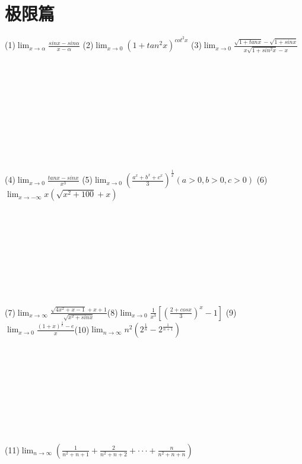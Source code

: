 \documentclass[UTF8]{ctexart}
\date{}
\begin{document}
\thispagestyle{fancy}
 \vspace{-8mm} \section{极限篇}
 (1)$\displaystyle{\lim_{x \to \alpha}\frac{sinx-sin\alpha}{x-\alpha}}$ \quad\quad\quad (2)$\displaystyle{\lim_{x \to 0}(1+tan^2x)^{cot^2x}}$ \quad\quad\quad (3)$\displaystyle{\lim_{x \to 0}\frac{\sqrt{1+tanx}-\sqrt{1+sinx}}{x\sqrt{1+sin^2x}-x}}$
 \\ \\ \\ \\ \\ \\ \\ \\ \\ \\ \\
 (4)$\displaystyle{\lim_{x \to 0}\frac{tanx-sinx}{x^3}}$ \quad\quad\quad (5)$\displaystyle{\lim_{x \to 0}(\frac{a^x+b^x+c^x}{3})^{\frac{1}{x}}}(a>0,b>0,c>0)$ \quad\quad\quad (6)$\displaystyle{\lim_{x \to -\infty}x(\sqrt{x^2+100}+x)}$
 \\ \\ \\ \\ \\ \\ \\ \\ \\ \\
 (7)$\displaystyle{\lim_{x \to \infty}\frac{\sqrt{4x^2+x-1}+x+1}{\sqrt{x^2+sinx}}}$\quad \quad (8)$\displaystyle{\lim_{x \to 0}\frac{1}{x^3}[(\frac{2+cosx}{3})^x-1]}$ \quad \quad (9)$\displaystyle{\lim_{x \to 0}\frac{(1+x)^{\frac{1}{x}}-e}{x}}$\quad \quad (10)$\displaystyle{\lim_{n \to \infty }n^2(2^{\frac{1}{n}}-2^{\frac{1}{n+1}})}$
 \\ \\ \\ \\ \\ \\ \\ \\ \\ \\
 (11)$\displaystyle{\lim_{n \to \infty} (\frac{1}{n^2+n+1}+\frac{2}{n^2+n+2}+\cdot\cdot\cdot+\frac{n}{n^2+n+n})}$
 \\ \\ \\ \\ \\ \\ \\ \\ \\ \\ \\
\end{document}
